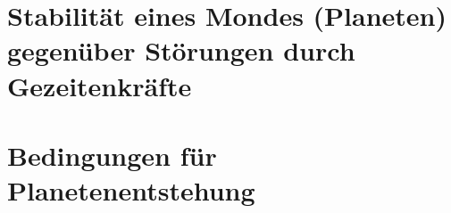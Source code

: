 \section{Stabilität eines Mondes (Planeten) gegenüber Störungen durch 
         Gezeitenkräfte}

\section{Bedingungen für Planetenentstehung}
